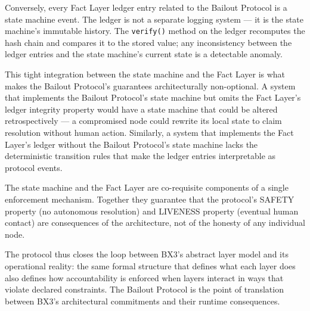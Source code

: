 \documentclass[12pt]{article}
\begin{document}
Conversely, every Fact Layer ledger entry related to the Bailout Protocol is a state machine event. The ledger is not a separate logging system --- it is the state machine's immutable history. The \texttt{verify()} method on the ledger recomputes the hash chain and compares it to the stored value; any inconsistency between the ledger entries and the state machine's current state is a detectable anomaly.

This tight integration between the state machine and the Fact Layer is what makes the Bailout Protocol's guarantees architecturally non-optional. A system that implements the Bailout Protocol's state machine but omits the Fact Layer's ledger integrity property would have a state machine that could be altered retrospectively --- a compromised node could rewrite its local state to claim resolution without human action. Similarly, a system that implements the Fact Layer's ledger without the Bailout Protocol's state machine lacks the deterministic transition rules that make the ledger entries interpretable as protocol events.

The state machine and the Fact Layer are co-requisite components of a single enforcement mechanism. Together they guarantee that the protocol's SAFETY property (no autonomous resolution) and LIVENESS property (eventual human contact) are consequences of the architecture, not of the honesty of any individual node.

The protocol thus closes the loop between BX3's abstract layer model and its operational reality: the same formal structure that defines what each layer does also defines how accountability is enforced when layers interact in ways that violate declared constraints. The Bailout Protocol is the point of translation between BX3's architectural commitments and their runtime consequences.

\end{document}
